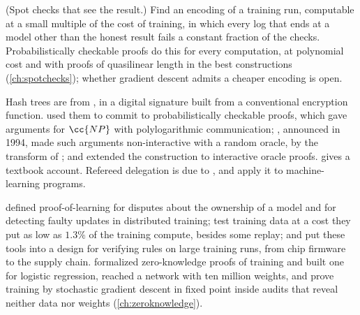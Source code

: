 \begin{refsection}
\begin{exercises}
\item \research (Spot checks that see the result.) Find an encoding of a training run, computable at a small multiple of the cost of training, in which every log that ends at a model other than the honest result fails a constant fraction of the checks. Probabilistically checkable proofs do this for every computation, at polynomial cost and with proofs of quasilinear length in the best constructions (\cref{ch:spotchecks}); whether gradient descent admits a cheaper encoding is open.\label{ex:training:distance}
\end{exercises}

\notesandrefs
Hash trees are from \textcite{Merkle1987}, in a digital signature built from a conventional encryption function. \Textcite{Kilian1992} used them to commit to probabilistically checkable proofs, which gave arguments for $\cc{NP}$ with polylogarithmic communication; \textcite{Micali2000}, announced in 1994, made such arguments non-interactive with a random oracle, by the transform of \textcite{FiatShamir1986}; and \textcite{BenSassonChiesaSpooner2016} extended the construction to interactive oracle proofs. \Textcite{Thaler2022} gives a textbook account. Refereed delegation is due to \textcite{CanettiRivaRothblum2011,CanettiRivaRothblum2013}, and \textcite{ArunEtAl2025} apply it to machine-learning programs.

\Textcite{JiaEtAl2021} defined proof-of-learning for disputes about the ownership of a model and for detecting faulty updates in distributed training; \textcite{ChoiShavitDuvenaud2023} test training data at a cost they put as low as $1.3\%$ of the training compute, besides some replay; and \textcite{Shavit2023} put these tools into a design for verifying rules on large training runs, from chip firmware to the supply chain. \Textcite{GargEtAl2023} formalized zero-knowledge proofs of training and built one for logistic regression, \textcite{AbbaszadehEtAl2024} reached a network with ten million weights, and \textcite{WaiwitlikhitEtAl2024} prove training by stochastic gradient descent in fixed point inside audits that reveal neither data nor weights (\cref{ch:zeroknowledge}).


\end{refsection}
